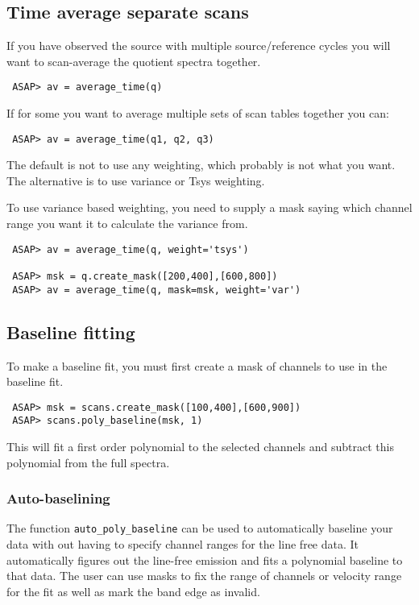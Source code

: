 \documentclass[11pt]{article}
\newcommand{\cmd}[1]{{\tt #1}}
\begin{document}
\subsection{Time average separate scans}

If you have observed the source with multiple source/reference cycles you
will want to scan-average the quotient spectra together.

\begin{verbatim}
 ASAP> av = average_time(q)
\end{verbatim}

If for some you want to average multiple sets of scan tables together you can:

\begin{verbatim}
 ASAP> av = average_time(q1, q2, q3)
\end{verbatim}

The default is not to use any weighting, which probably is not what
you want. The alternative is to use variance or Tsys weighting.

To use variance based weighting, you need to supply a mask saying which
channel range you want it to calculate the variance from.

\begin{verbatim}
 ASAP> av = average_time(q, weight='tsys')

 ASAP> msk = q.create_mask([200,400],[600,800])
 ASAP> av = average_time(q, mask=msk, weight='var')
\end{verbatim}

\subsection{Baseline fitting}

To make a baseline fit, you must first create a mask of channels to
use in the baseline fit. 

\begin{verbatim}
 ASAP> msk = scans.create_mask([100,400],[600,900])
 ASAP> scans.poly_baseline(msk, 1) 
\end{verbatim}

This will fit a first order polynomial to the selected channels and subtract
this polynomial from the full spectra.

\subsubsection{Auto-baselining}

The function \cmd{auto\_poly\_baseline} can be used to automatically
baseline your data with out having to specify channel ranges for
the line free data. It automatically figures out the line-free
emission and fits a polynomial baseline to that data. The user can use
masks to fix the range of channels or velocity range for the fit as
well as mark the band edge as invalid. 
\end{document}
